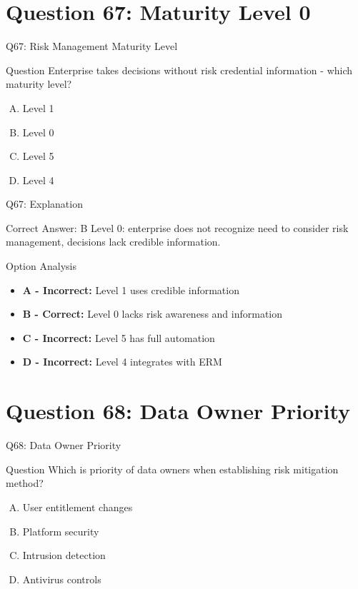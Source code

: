 \documentclass{beamer}
\begin{document}
	\section{Question 67: Maturity Level 0}
	
	\begin{frame}{Q67: Risk Management Maturity Level}
		\begin{block}{Question}
			Enterprise takes decisions without risk credential information - which maturity level?
		\end{block}
		\begin{enumerate}[(A)]
			\item Level 1
			\item Level 0
			\item Level 5
			\item Level 4
		\end{enumerate}
	\end{frame}
	
	\begin{frame}{Q67: Explanation}
		\begin{block}{Correct Answer: B}
			Level 0: enterprise does not recognize need to consider risk management, decisions lack credible information.
		\end{block}
		\begin{block}{Option Analysis}
			\begin{itemize}
				\item \textbf{A - Incorrect:} Level 1 uses credible information
				\item \textbf{B - Correct:} Level 0 lacks risk awareness and information
				\item \textbf{C - Incorrect:} Level 5 has full automation
				\item \textbf{D - Incorrect:} Level 4 integrates with ERM
			\end{itemize}
		\end{block}
	\end{frame}
	
	\section{Question 68: Data Owner Priority}
	
	\begin{frame}{Q68: Data Owner Priority}
		\begin{block}{Question}
			Which is priority of data owners when establishing risk mitigation method?
		\end{block}
		\begin{enumerate}[(A)]
			\item User entitlement changes
			\item Platform security
			\item Intrusion detection
			\item Antivirus controls
		\end{enumerate}
	\end{frame}
	
\end{document}
